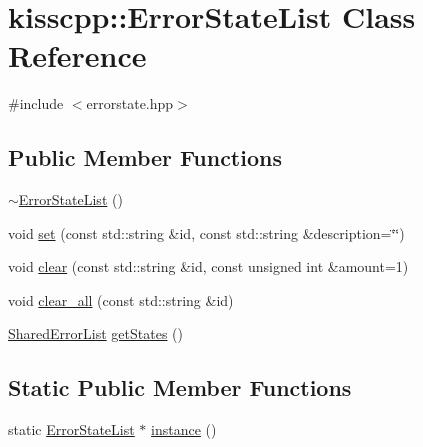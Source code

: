 \hypertarget{classkisscpp_1_1_error_state_list}{\section{kisscpp\-:\-:Error\-State\-List Class Reference}
\label{classkisscpp_1_1_error_state_list}
}


{\ttfamily \#include $<$errorstate.\-hpp$>$}

\subsection*{Public Member Functions}
\begin{DoxyCompactItemize}
\item 
\hyperlink{classkisscpp_1_1_error_state_list_a0c53a01c63906189fad454dd5e217181}{$\sim$\-Error\-State\-List} ()
\item 
void \hyperlink{classkisscpp_1_1_error_state_list_aa86f762158b9106efa816e45b9da8647}{set} (const std\-::string \&id, const std\-::string \&description=\char`\"{}\char`\"{})
\item 
void \hyperlink{classkisscpp_1_1_error_state_list_a848953f011b5acc35538bb82f35ef67f}{clear} (const std\-::string \&id, const unsigned int \&amount=1)
\item 
void \hyperlink{classkisscpp_1_1_error_state_list_a4cf6d39a68e8dbbae8111ea383aaf14a}{clear\-\_\-all} (const std\-::string \&id)
\item 
\hyperlink{namespacekisscpp_a97f51b10e50fc4e1f9142a9e909d477b}{Shared\-Error\-List} \hyperlink{classkisscpp_1_1_error_state_list_a43c892e8867778f7e6602253cfe03c45}{get\-States} ()
\end{DoxyCompactItemize}
\subsection*{Static Public Member Functions}
\begin{DoxyCompactItemize}
\item 
static \hyperlink{classkisscpp_1_1_error_state_list}{Error\-State\-List} $\ast$ \hyperlink{classkisscpp_1_1_error_state_list_a20309374dc63ffee8aebeb986340dfba}{instance} ()
\end{DoxyCompactItemize}


